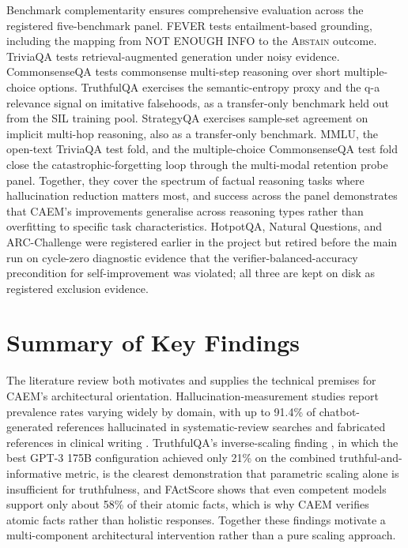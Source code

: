 Benchmark complementarity ensures comprehensive evaluation across the registered five-benchmark panel. FEVER tests entailment-based grounding, including the mapping from NOT ENOUGH INFO to the \textsc{Abstain} outcome. TriviaQA tests retrieval-augmented generation under noisy evidence. CommonsenseQA tests commonsense multi-step reasoning over short multiple-choice options. TruthfulQA exercises the semantic-entropy proxy and the q-a relevance signal on imitative falsehoods, as a transfer-only benchmark held out from the SIL training pool. StrategyQA exercises sample-set agreement on implicit multi-hop reasoning, also as a transfer-only benchmark. MMLU, the open-text TriviaQA test fold, and the multiple-choice CommonsenseQA test fold close the catastrophic-forgetting loop through the multi-modal retention probe panel. Together, they cover the spectrum of factual reasoning tasks where hallucination reduction matters most, and success across the panel demonstrates that CAEM's improvements generalise across reasoning types rather than overfitting to specific task characteristics. HotpotQA, Natural Questions, and ARC-Challenge were registered earlier in the project but retired before the main run on cycle-zero diagnostic evidence that the verifier-balanced-accuracy precondition for self-improvement was violated; all three are kept on disk as registered exclusion evidence.

\section{Summary of Key Findings}

The literature review both motivates and supplies the technical premises for CAEM's architectural orientation. Hallucination-measurement studies report prevalence rates varying widely by domain, with up to 91.4\% of chatbot-generated references hallucinated in systematic-review searches \cite{info:doi/10.2196/53164} and fabricated references in clinical writing \cite{alkaissi2023artificial}. TruthfulQA's inverse-scaling finding \cite{lin-etal-2022-truthfulqa}, in which the best GPT-3 175B configuration achieved only 21\% on the combined truthful-and-informative metric, is the clearest demonstration that parametric scaling alone is insufficient for truthfulness, and FActScore \cite{min-etal-2023-factscore} shows that even competent models support only about 58\% of their atomic facts, which is why CAEM verifies atomic facts rather than holistic responses. Together these findings motivate a multi-component architectural intervention rather than a pure scaling approach.

